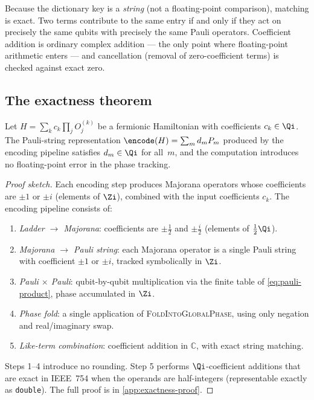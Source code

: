Because the dictionary key is a \emph{string} (not a floating-point
comparison), matching is exact.  Two terms contribute to the same
entry if and only if they act on precisely the same qubits with
precisely the same Pauli operators.  Coefficient addition is ordinary
complex addition — the only point where floating-point arithmetic
enters — and cancellation (removal of zero-coefficient terms) is
checked against exact zero.

\subsection{The exactness theorem}
\label{sec:ex-theorem}

\begin{theorem}
\label{thm:exactness}
Let $H = \sum_k c_k \prod_j O_j^{(k)}$ be a fermionic Hamiltonian
with coefficients $c_k \in \Qi$.  The Pauli-string representation
$\encode(H) = \sum_m d_m P_m$ produced by the encoding pipeline
satisfies $d_m \in \Qi$ for all~$m$, and the computation introduces
no floating-point error in the phase tracking.
\end{theorem}

\begin{proof}[Proof sketch]
Each encoding step produces Majorana operators whose coefficients are
$\pm 1$ or $\pm i$ (elements of $\Zi$), combined with the
input coefficients $c_k$.  The encoding pipeline consists of:
\begin{enumerate}
  \item \emph{Ladder $\to$ Majorana}: coefficients are
    $\pm\frac{1}{2}$ and $\pm\frac{i}{2}$ (elements of
    $\frac{1}{2}\Qi$).
  \item \emph{Majorana $\to$ Pauli string}: each Majorana operator is
    a single Pauli string with coefficient $\pm 1$ or $\pm i$,
    tracked symbolically in $\Zi$.
  \item \emph{Pauli $\times$ Pauli}: qubit-by-qubit multiplication
    via the finite table of \cref{eq:pauli-product}, phase
    accumulated in $\Zi$.
  \item \emph{Phase fold}: a single application of
    \textsc{FoldIntoGlobalPhase}, using only negation and
    real/imaginary swap.
  \item \emph{Like-term combination}: coefficient addition in
    $\mathbb{C}$, with exact string matching.
\end{enumerate}
Steps 1--4 introduce no rounding.  Step 5 performs
$\Qi$-coefficient additions that are exact in IEEE~754 when
the operands are half-integers (representable exactly as
\texttt{double}).  The full proof is in \cref{app:exactness-proof}.
\end{proof}

